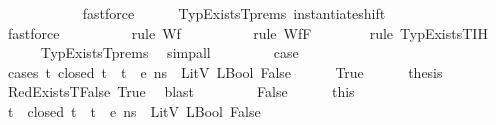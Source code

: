 \begin{isabellebody}
\ \ \ \ \ \ \ \ \ \ \isamarkupfalse%
\ fastforce\isanewline
\ \ \ \ \isamarkupfalse%
\ TypExistsT{\isachardot}{\kern0pt}prems\ instantiate{\isacharunderscore}{\kern0pt}shift\isanewline
\ \ \ \ \ \ \ \ \ \isamarkupfalse%
\ fastforce\isanewline
\ \ \ \ \ \ \ \ \isamarkupfalse%
\ {\isacharparenleft}{\kern0pt}rule\ Wf{\isacharunderscore}{\kern0pt}{\isasymGamma}{\isacharparenright}{\kern0pt}\isanewline
\ \ \ \ \ \ \ \ \isamarkupfalse%
\ {\isacharparenleft}{\kern0pt}rule\ Wf{\isacharunderscore}{\kern0pt}F{\isacharparenright}{\kern0pt}\isanewline
\ \ \ \ \ \ \isamarkupfalse%
\ {\isacharparenleft}{\kern0pt}rule\ TypExistsT{\isachardot}{\kern0pt}IH{\isacharparenleft}{\kern0pt}{}{\isacharparenright}{\kern0pt}{\isacharparenright}{\kern0pt}\isanewline
\ \ \ \ \isamarkupfalse%
\ TypExistsT{\isachardot}{\kern0pt}prems\ \isamarkupfalse%
\ simp{\isacharunderscore}{\kern0pt}all\isanewline
\ \ \ \ \isamarkupfalse%
\isanewline
\ \ \isamarkupfalse%
\ {\isacharquery}{\kern0pt}case\isanewline
\ \ \isamarkupfalse%
\ {\isacharparenleft}{\kern0pt}cases\ {\isachardoublequoteopen}{\isasymforall}t{\isachardot}{\kern0pt}\ closed\ t\ {\isasymlongrightarrow}\ {\isasymLambda}{\isacharcomma}{\kern0pt}{\isasymGamma}{\isacharcomma}{\kern0pt}t{\isacharhash}{\kern0pt}{\isasymOmega}\ {\isasymturnstile}\ {\isasymlangle}e{\isacharcomma}{\kern0pt}\ n{\isacharunderscore}{\kern0pt}s{\isasymrangle}\ {\isasymDown}\ LitV\ {\isacharparenleft}{\kern0pt}LBool\ False{\isacharparenright}{\kern0pt}{\isachardoublequoteclose}{\isacharparenright}{\kern0pt}\isanewline
\ \ \ \ \isamarkupfalse%
\ True\isanewline
\ \ \ \ \isamarkupfalse%
\ {\isacharquery}{\kern0pt}thesis\isanewline
\ \ \ \ \ \ \isamarkupfalse%
\ RedExistsT{\isacharunderscore}{\kern0pt}False\ True\ \isamarkupfalse%
\ blast\isanewline
\ \ \isamarkupfalse%
\isanewline
\ \ \ \ \isamarkupfalse%
\ False\isanewline
\ \ \ \ \isamarkupfalse%
\ this\ \isamarkupfalse%
\ t\ \ {\isachardoublequoteopen}closed\ t{\isachardoublequoteclose}\ \ {\isachardoublequoteopen}{\isasymnot}{\isacharparenleft}{\kern0pt}{\isasymLambda}{\isacharcomma}{\kern0pt}{\isasymGamma}{\isacharcomma}{\kern0pt}t{\isacharhash}{\kern0pt}{\isasymOmega}\ {\isasymturnstile}\ {\isasymlangle}e{\isacharcomma}{\kern0pt}\ n{\isacharunderscore}{\kern0pt}s{\isasymrangle}\ {\isasymDown}\ LitV\ {\isacharparenleft}{\kern0pt}LBool\ False{\isacharparenright}{\kern0pt}{\isacharparenright}{\kern0pt}{\isachardoublequoteclose}\ \isamarkupfalse%

\end{isabellebody}

